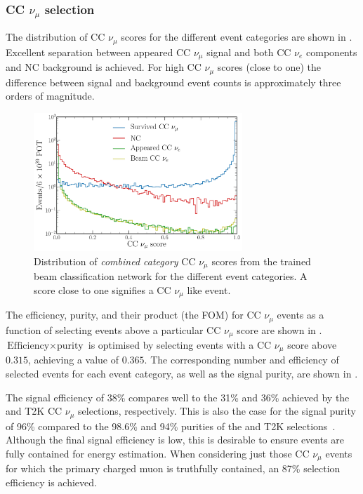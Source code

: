 \subsubsection*{CC $\nu_{\mu}$ selection} %

The distribution of CC $\nu_{\mu}$ scores for the different event categories are shown in
. Excellent separation between appeared CC $\nu_{\mu}$
signal and both CC $\nu_{e}$ components and NC background is achieved. For high CC $\nu_{\mu}$
scores (close to one) the difference between signal and background event counts is approximately
three orders of magnitude.

\begin{figure} %
    \includegraphics[width=0.7\textwidth]{diagrams/7-results/final_beam_numu_outputs.pdf}
    \caption[Distribution of CC $\nu_{\mu}$ scores from the trained beam classification network]
    {Distribution of \emph{combined category} CC $\nu_{\mu}$ scores from the trained beam
        classification network for the different event categories. A score close to one signifies
        a CC $\nu_{\mu}$ like event.}
    \label{fig:final_beam_numu_outputs}
\end{figure}

The efficiency, purity, and their product (the FOM) for CC $\nu_{\mu}$ events as a function of
selecting events above a particular CC $\nu_{\mu}$ score are shown in
. $\text{Efficiency}\times\text{purity}$ is optimised by
selecting events with a CC $\nu_{\mu}$ score above $0.315$, achieving a value of $0.365$. The
corresponding number and efficiency of selected events for each event category, as well as the
signal purity, are shown in . 

The signal efficiency of 38\% compares well to the 31\% and 36\% achieved by the \nova and T2K CC
$\nu_{\mu}$ selections, respectively. This is also the case for the signal purity of 96\% compared
to the 98.6\% and 94\% purities of the \nova and T2K selections~\cite{acero2019, abe2015}.
Although the final signal efficiency is low, this is desirable to ensure events are fully
contained for energy estimation. When considering just those CC $\nu_{\mu}$ events for which the
primary charged muon is truthfully contained, an 87\% selection efficiency is achieved.


